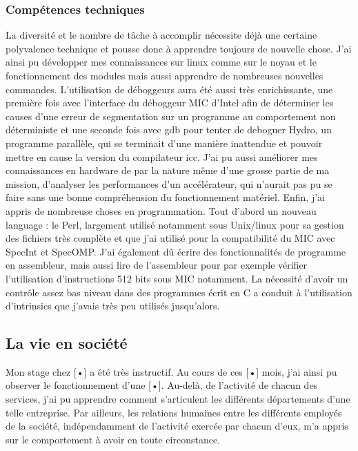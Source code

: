 \documentclass[11pt]{article}
\begin{document}
			\subsubsection{Compétences techniques}
			La diversité et le nombre de tâche à accomplir nécessite déjà une certaine polyvalence technique et pousse donc à 
			apprendre toujours de nouvelle chose. J'ai ainsi pu développer mes connaissances sur linux comme sur le noyau et 
			le fonctionnement des modules mais aussi apprendre de nombreuses nouvelles commandes. \newline
			L'utilisation de déboggeurs aura été aussi très enrichissante, une première fois avec l'interface du déboggeur 
			MIC d'Intel afin de déterminer les causes d'une erreur de segmentation sur un programme au comportement non 
			déterministe et une seconde fois avec gdb pour tenter de deboguer Hydro, un programme parallèle, qui se terminait 
			d'une manière inattendue et pouvoir mettre en cause la version du compilateur icc. \newline
			J'ai pu aussi améliorer mes connaissances en hardware de par la nature même d'une grosse partie de ma mission, d'analyser 
			les performances d'un accélérateur, qui n'aurait pas pu se faire sans une bonne compréhension du fonctionnement matériel. \newline
			Enfin, j'ai appris de nombreuse choses en programmation. Tout d'abord un nouveau language : le Perl, largement utilisé 
			notamment sous Unix/linux pour sa gestion des fichiers très complète et que j'ai utilisé pour la compatibilité du MIC 
			avec SpecInt et SpecOMP. J'ai également dû écrire des fonctionnalités de programme en assembleur, mais aussi lire 
			de l'assembleur pour par exemple vérifier l'utilisation d'instructions 512 bits sous MIC notamment. La nécessité 
			d'avoir un contrôle assez bas niveau dans des programmes écrit en C a conduit à l'utilisation d'intrinsics que j'avais 
			très peu utilisés jusqu'alors.
		\subsection{La vie en société}
		Mon stage chez [•] a été très instructif. Au cours de ces [•] mois, j’ai ainsi pu observer le fonctionnement 
		d’une [•]. Au-delà, de l’activité de chacun des services, j’ai pu apprendre comment s’articulent les différents 
		départements d’une telle entreprise. Par ailleurs, les relations humaines entre les différents employés de la 
		société, indépendamment de l’activité exercée par chacun d’eux, m’a appris sur le comportement à avoir en toute 
		circonstance.
\newpage
{}
\end{document}
